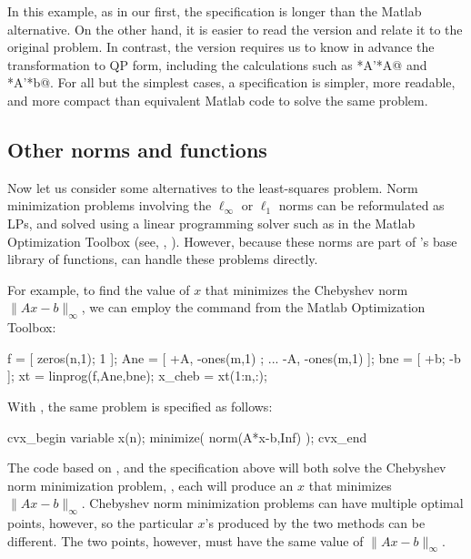 \documentclass[12pt]{article}
\begin{document}
In this example, as in our first, the \cvx specification is 
longer than the Matlab alternative. On the other hand, it is easier
to read the \cvx version and relate it to the original problem.
In contrast, the \verb@quadprog@ version requires us to know in advance
the transformation to QP form, including the calculations
such as *A'*A@ and *A'*b@.
For all but the simplest cases, a \cvx
specification is simpler, more readable, and more compact than
equivalent Matlab code to solve the same problem.

\subsection{Other norms and functions}
\label{sec:othernorms}

Now let us consider some alternatives to the least-squares problem.
Norm minimization problems involving the $\ell_\infty$ or
$\ell_1$ norms can be reformulated as LPs, and solved using
a linear programming solver such as \verb@linprog@ in the Matlab
Optimization Toolbox (see, \eg, \cite[\S 6.1]{BV:04}). However,
because these norms are part of \cvx's base library of functions,
\cvx can handle these problems directly.

For example, to find the value of $x$ that minimizes
the Chebyshev norm $\|Ax-b\|_\infty$, we can employ the \verb@linprog@
command from the Matlab Optimization Toolbox:
\begin{code2}[firstnumber=97]
	f    = [ zeros(n,1); 1          ];
	Ane  = [ +A,         -ones(m,1)  ; ...
	         -A,         -ones(m,1) ];
	bne  = [ +b;         -b         ];
	xt   = linprog(f,Ane,bne);
	x_cheb = xt(1:n,:);
\end{code2}
With \cvx, the same problem is specified as follows:
\begin{code2}[firstnumber=108]
	cvx_begin
	    variable x(n);
	    minimize( norm(A*x-b,Inf) );
	cvx_end
\end{code2}
The code based on
\verb@linprog@, and the \cvx specification above will both
solve the Chebyshev norm minimization problem, \ie,
each will produce an $x$ that minimizes $\|Ax-b\|_\infty$.
Chebyshev norm minimization problems can have multiple optimal
points, however, so the particular $x$'s produced by the two
methods can be different.  The two points, however, must 
have the same value of $\|Ax-b\|_\infty$.
\end{document}
